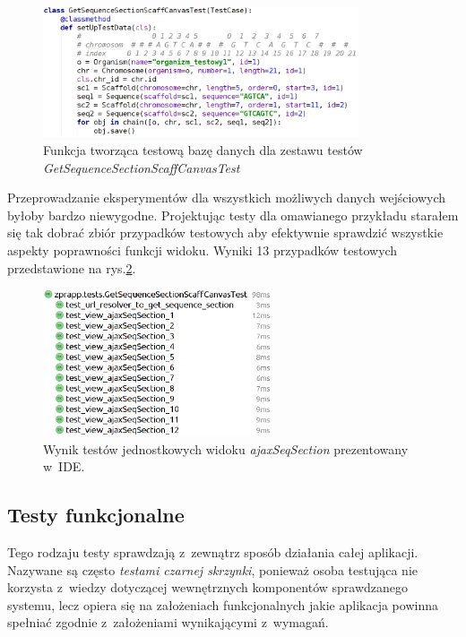 \documentclass[a4paper,12pt,oneside]{mwrep}  %
\begin{document}
\begin{figure}[!h]
\centering
\renewcommand{\figurename}{Listing.}
\includegraphics[width=0.83\textwidth]{grafika/testowa_bd_unit_test.png}
\caption{Funkcja tworząca testową bazę danych dla zestawu testów \emph{GetSequenceSectionScaffCanvasTest}}
\label{unit_test_db}
\end{figure}

Przeprowadzanie eksperymentów dla wszystkich możliwych danych wejściowych byłoby bardzo niewygodne. Projektując testy dla omawianego przykładu starałem się tak dobrać zbiór przypadków testowych aby efektywnie sprawdzić wszystkie aspekty poprawności funkcji widoku. Wyniki 13 przypadków testowych przedstawione na rys.\ref{testy_jednostkowe_pycharm}.

\begin{figure}[!h]
\centering
\includegraphics[width=0.6\textwidth]{grafika/testy_jednostkowe_wyniki_pycharm.png}
\caption{Wynik testów jednostkowych widoku \emph{ajaxSeqSection} prezentowany w~IDE.}
\label{testy_jednostkowe_pycharm}
\end{figure}

\subsection{Testy funkcjonalne}
Tego rodzaju testy sprawdzają z~zewnątrz sposób działania całej aplikacji. Nazywane są często \emph{testami czarnej skrzynki}, ponieważ osoba testująca nie korzysta z~wiedzy dotyczącej wewnętrznych komponentów sprawdzanego systemu, lecz opiera się na założeniach funkcjonalnych jakie aplikacja powinna spełniać zgodnie z~założeniami wynikającymi z~wymagań.
\end{document}
